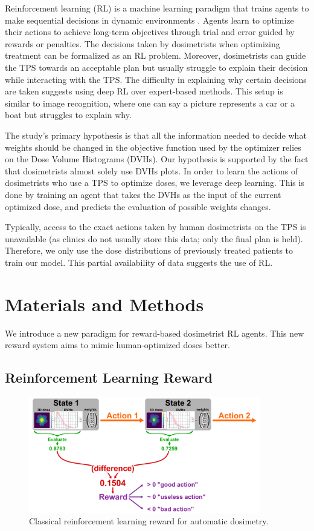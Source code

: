 Reinforcement learning (RL) is a machine learning paradigm that trains agents to make sequential decisions in dynamic environments \cite{brooks_what_2021}.
Agents learn to optimize their actions to achieve long-term objectives through trial and error guided by rewards or penalties.
The decisions taken by dosimetrists when optimizing treatment can be formalized as an RL problem.
Moreover, dosimetrists can guide the TPS towards an acceptable plan but usually struggle to explain their decision while interacting with the TPS.
The difficulty in explaining why certain decisions are taken suggests using deep RL over expert-based methods.
This setup is similar to image recognition, where one can say a picture represents a car or a boat but struggles to explain why.

The study’s primary hypothesis is that all the information needed to decide what weights should be changed in the objective function used by the optimizer relies on the Dose Volume Histograms (DVHs).
Our hypothesis is supported by the fact that dosimetrists almost solely use DVHs plots.
In order to learn the actions of dosimetrists who use a TPS to optimize doses, we leverage deep learning.
This is done by training an agent that takes the DVHs as the input of the current optimized dose, and predicts the evaluation of possible weights changes.

Typically, access to the exact actions taken by human dosimetrists on the TPS is unavailable (as clinics do not usually store this data; only the final plan is held).
Therefore, we only use the dose distributions of previously treated patients to train our model.
This partial availability of data suggests the use of RL.

\section{Materials and Methods}
We introduce a new paradigm for reward-based dosimetrist RL agents.
This new reward system aims to mimic human-optimized doses better.

\subsection{Reinforcement Learning Reward}

\begin{figure}
	\centering
	\includegraphics[width=0.9\textwidth]{reward.pdf}
	\caption{Classical reinforcement learning reward for automatic dosimetry.}
	\label{fig:reward_fig}
\end{figure}

